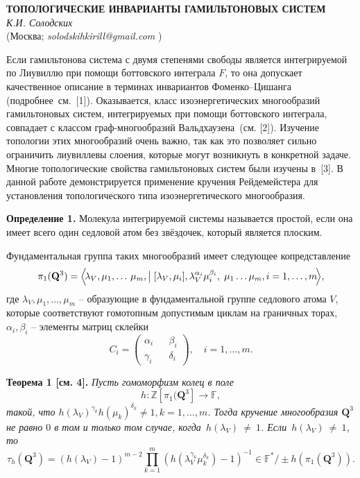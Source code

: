 \begin{center}{ \bf  ТОПОЛОГИЧЕСКИЕ ИНВАРИАНТЫ ГАМИЛЬТОНОВЫХ СИСТЕМ}\\
{\it К.И. Солодских } \\
(Москва; {\it solodskihkirill@gmail.com} )
\end{center}


Если гамильтонова система с двумя степенями свободы является интегрируемой по Лиувиллю
при помощи боттовского интеграла $F$,
то она допускает качественное описание в терминах инвариантов Фоменко--Цишанга (подробнее~см.~[1]).
Оказывается, класс изоэнергетических многообразий гамильтоновых систем,
интегрируемых при помощи боттовского интеграла,
совпадает с классом граф-многообразий Вальдхаузена~(см. [2]).
Изучение топологии этих многообразий очень важно, так как это позволяет сильно ограничить лиувиллевы слоения,
которые могут возникнуть в конкретной задаче.
Многие топологические свойства гамильтоновых систем были изучены в~[3].
В данной работе демонстрируется  применение кручения Рейдемейстера
для установления топологического типа изоэнергетического многообразия.

\textbf{Определение 1.}
Молекула интегрируемой системы называется простой,
если она имеет всего один седловой атом без звёздочек, который является плоским.

Фундаментальная группа таких многообразий имеет следующее копредставление
$$
\pi_1(\mathbf{Q}^3) = \left\langle\!\lambda_V, \mu_1, \dots\, \mu_{m}, \bigm|  [\lambda_V, \mu_i], \lambda_V^{\alpha_i}\mu_i^{\beta_i} ,\;\mu_1\dots\mu_m,\\ i = 1,\dots, m\!\right\rangle\!,
$$
где $\lambda_V, \mu_1, \dots, \mu_m$ -- образующие в фундаментальной группе седлового атома $V$,
которые соответствуют гомотопным допустимым циклам на граничных торах,
$\alpha_i, \beta_i$ -- элементы матриц склейки
$$
C_i = \begin{pmatrix} \alpha_i && \beta_i \\ \gamma_i && \delta_i \end{pmatrix},\quad i = 1,\dots, m.
$$

\textbf{Теорема 1 [см. 4].} {\it Пусть гомоморфизм колец в поле
$$
h \colon \mathbb{Z}[\pi_1(\mathbf{Q}^3] \rightarrow \mathbb{F},
$$
такой, что $h(\lambda_V)^{\gamma_k}h(\mu_k)^{\delta_k} \ne 1, k = 1,\dots, m$.
Тогда кручение многообразия $\mathbf{Q}^3$ не равно $0$ в том и только том случае,
когда~$h(\lambda_V)~\ne~1$.
Если~$h(\lambda_V)~\ne~1$, то
$$
\tau_h(\mathbf{Q}^3) = (h(\lambda_V) - 1)^{m-2}{\underset{k=1}{\overset{m}{\prod}}(h(\lambda^{\gamma_k}_V\mu^{\delta_k}_k) - 1)^{-1}} \in \mathbb{F}^*/\pm h(\pi_1(\mathbf{Q}^3)).
$$}


